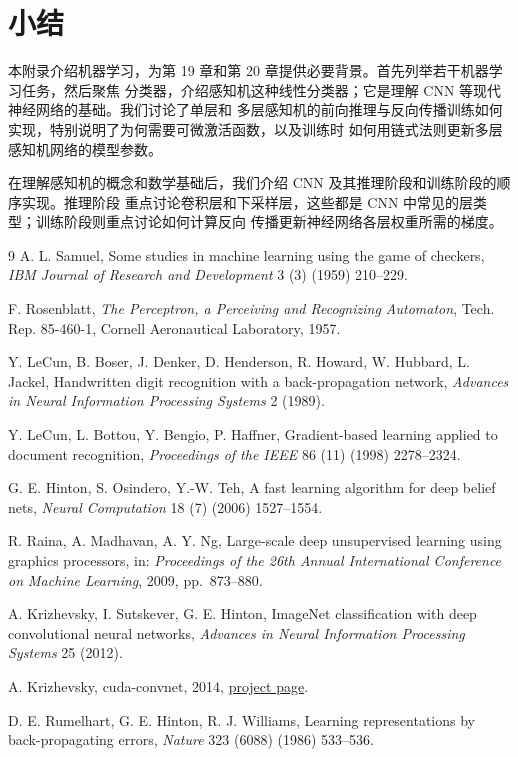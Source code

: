 \section{小结}
\label{sec:appb-summary}

本附录介绍机器学习，为第 19 章和第 20 章提供必要背景。首先列举若干机器学习任务，然后聚焦
分类器，介绍感知机这种线性分类器；它是理解 CNN 等现代神经网络的基础。我们讨论了单层和
多层感知机的前向推理与反向传播训练如何实现，特别说明了为何需要可微激活函数，以及训练时
如何用链式法则更新多层感知机网络的模型参数。

在理解感知机的概念和数学基础后，我们介绍 CNN 及其推理阶段和训练阶段的顺序实现。推理阶段
重点讨论卷积层和下采样层，这些都是 CNN 中常见的层类型；训练阶段则重点讨论如何计算反向
传播更新神经网络各层权重所需的梯度。

\begin{chapterbibliography}{9}
  A. L. Samuel, Some studies in machine learning using the game of checkers,
  \emph{IBM Journal of Research and Development} 3 (3) (1959) 210--229.

  F. Rosenblatt, \emph{The Perceptron, a Perceiving and Recognizing Automaton},
  Tech. Rep. 85-460-1, Cornell Aeronautical Laboratory, 1957.

  Y. LeCun, B. Boser, J. Denker, D. Henderson, R. Howard, W. Hubbard, L. Jackel,
  Handwritten digit recognition with a back-propagation network,
  \emph{Advances in Neural Information Processing Systems} 2 (1989).

  Y. LeCun, L. Bottou, Y. Bengio, P. Haffner, Gradient-based learning applied to
  document recognition, \emph{Proceedings of the IEEE} 86 (11) (1998) 2278--2324.

  G. E. Hinton, S. Osindero, Y.-W. Teh, A fast learning algorithm for deep belief
  nets, \emph{Neural Computation} 18 (7) (2006) 1527--1554.

  R. Raina, A. Madhavan, A. Y. Ng, Large-scale deep unsupervised learning using
  graphics processors, in: \emph{Proceedings of the 26th Annual International
  Conference on Machine Learning}, 2009, pp.~873--880.

  A. Krizhevsky, I. Sutskever, G. E. Hinton, ImageNet classification with deep
  convolutional neural networks, \emph{Advances in Neural Information Processing
  Systems} 25 (2012).

  A. Krizhevsky, cuda-convnet, 2014,
  \href{https://code.google.com/p/cuda-convnet/}{project page}.

  D. E. Rumelhart, G. E. Hinton, R. J. Williams, Learning representations by
  back-propagating errors, \emph{Nature} 323 (6088) (1986) 533--536.
\end{chapterbibliography}
